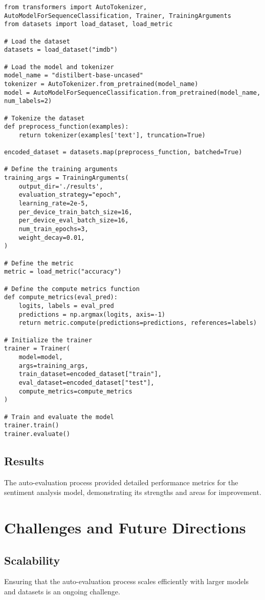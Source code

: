 \begin{verbatim}
from transformers import AutoTokenizer, AutoModelForSequenceClassification, Trainer, TrainingArguments
from datasets import load_dataset, load_metric

# Load the dataset
datasets = load_dataset("imdb")

# Load the model and tokenizer
model_name = "distilbert-base-uncased"
tokenizer = AutoTokenizer.from_pretrained(model_name)
model = AutoModelForSequenceClassification.from_pretrained(model_name, num_labels=2)

# Tokenize the dataset
def preprocess_function(examples):
    return tokenizer(examples['text'], truncation=True)

encoded_dataset = datasets.map(preprocess_function, batched=True)

# Define the training arguments
training_args = TrainingArguments(
    output_dir='./results',
    evaluation_strategy="epoch",
    learning_rate=2e-5,
    per_device_train_batch_size=16,
    per_device_eval_batch_size=16,
    num_train_epochs=3,
    weight_decay=0.01,
)

# Define the metric
metric = load_metric("accuracy")

# Define the compute metrics function
def compute_metrics(eval_pred):
    logits, labels = eval_pred
    predictions = np.argmax(logits, axis=-1)
    return metric.compute(predictions=predictions, references=labels)

# Initialize the trainer
trainer = Trainer(
    model=model,
    args=training_args,
    train_dataset=encoded_dataset["train"],
    eval_dataset=encoded_dataset["test"],
    compute_metrics=compute_metrics
)

# Train and evaluate the model
trainer.train()
trainer.evaluate()
\end{verbatim}

\subsection{Results}
The auto-evaluation process provided detailed performance metrics for the sentiment analysis model, demonstrating its strengths and areas for improvement.

\section{Challenges and Future Directions}

\subsection{Scalability}
Ensuring that the auto-evaluation process scales efficiently with larger models and datasets is an ongoing challenge.


